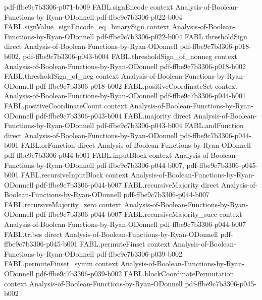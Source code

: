 \begin{theorem}
  {pdf-ffbe9c7b3306-p071-b009}
\proofstep
  {FABL.signEncode}
  {context}
  {Analysis-of-Boolean-Functions-by-Ryan-ODonnell}
  {pdf-ffbe9c7b3306-p022-b004}
\proofstep
  {FABL.signValue_signEncode_eq_binarySign}
  {context}
  {Analysis-of-Boolean-Functions-by-Ryan-ODonnell}
  {pdf-ffbe9c7b3306-p022-b004}
\proofstep
  {FABL.thresholdSign}
  {direct}
  {Analysis-of-Boolean-Functions-by-Ryan-ODonnell}
  {pdf-ffbe9c7b3306-p018-b002,
    pdf-ffbe9c7b3306-p043-b004}
\proofstep
  {FABL.thresholdSign_of_nonneg}
  {context}
  {Analysis-of-Boolean-Functions-by-Ryan-ODonnell}
  {pdf-ffbe9c7b3306-p018-b002}
\proofstep
  {FABL.thresholdSign_of_neg}
  {context}
  {Analysis-of-Boolean-Functions-by-Ryan-ODonnell}
  {pdf-ffbe9c7b3306-p018-b002}
\proofstep
  {FABL.positiveCoordinateSet}
  {context}
  {Analysis-of-Boolean-Functions-by-Ryan-ODonnell}
  {pdf-ffbe9c7b3306-p044-b001}
\proofstep
  {FABL.positiveCoordinateCount}
  {context}
  {Analysis-of-Boolean-Functions-by-Ryan-ODonnell}
  {pdf-ffbe9c7b3306-p043-b004}
\proofstep
  {FABL.majority}
  {direct}
  {Analysis-of-Boolean-Functions-by-Ryan-ODonnell}
  {pdf-ffbe9c7b3306-p043-b004}
\proofstep
  {FABL.andFunction}
  {direct}
  {Analysis-of-Boolean-Functions-by-Ryan-ODonnell}
  {pdf-ffbe9c7b3306-p044-b001}
\proofstep
  {FABL.orFunction}
  {direct}
  {Analysis-of-Boolean-Functions-by-Ryan-ODonnell}
  {pdf-ffbe9c7b3306-p044-b001}
\proofstep
  {FABL.inputBlock}
  {context}
  {Analysis-of-Boolean-Functions-by-Ryan-ODonnell}
  {pdf-ffbe9c7b3306-p044-b007,
    pdf-ffbe9c7b3306-p045-b001}
\proofstep
  {FABL.recursiveInputBlock}
  {context}
  {Analysis-of-Boolean-Functions-by-Ryan-ODonnell}
  {pdf-ffbe9c7b3306-p044-b007}
\proofstep
  {FABL.recursiveMajority}
  {direct}
  {Analysis-of-Boolean-Functions-by-Ryan-ODonnell}
  {pdf-ffbe9c7b3306-p044-b007}
\proofstep
  {FABL.recursiveMajority_zero}
  {context}
  {Analysis-of-Boolean-Functions-by-Ryan-ODonnell}
  {pdf-ffbe9c7b3306-p044-b007}
\proofstep
  {FABL.recursiveMajority_succ}
  {context}
  {Analysis-of-Boolean-Functions-by-Ryan-ODonnell}
  {pdf-ffbe9c7b3306-p044-b007}
\proofstep
  {FABL.tribes}
  {direct}
  {Analysis-of-Boolean-Functions-by-Ryan-ODonnell}
  {pdf-ffbe9c7b3306-p045-b001}
\proofstep
  {FABL.permuteFinset}
  {context}
  {Analysis-of-Boolean-Functions-by-Ryan-ODonnell}
  {pdf-ffbe9c7b3306-p039-b002}
\proofstep
  {FABL.permuteFinset_symm}
  {context}
  {Analysis-of-Boolean-Functions-by-Ryan-ODonnell}
  {pdf-ffbe9c7b3306-p039-b002}
\proofstep
  {FABL.blockCoordinatePermutation}
  {context}
  {Analysis-of-Boolean-Functions-by-Ryan-ODonnell}
  {pdf-ffbe9c7b3306-p045-b002}

\end{theorem}

